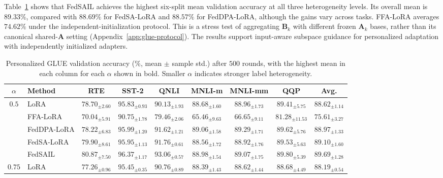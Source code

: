 \documentclass[11pt,letterpaper]{article}
\newcommand{\bA}{\mathbf{A}}
\newcommand{\bB}{\mathbf{B}}
\begin{document}
Table~\ref{tab:glue-personalized} shows that FedSAIL achieves the highest
six-split mean validation accuracy at all three heterogeneity levels.
Its overall mean is $89.33\%$, compared with $88.69\%$ for FedSA-LoRA and
$88.57\%$ for FedDPA-LoRA, although the gains vary across tasks.
FFA-LoRA averages $74.62\%$ under the independent-initialization protocol.
This is a stress test of aggregating $\bB_k$ with different frozen
$\bA_k$ bases, rather than its canonical shared-$\bA$ setting
(Appendix~\ref{app:glue-protocol}). The results support input-aware
subspace guidance for personalized adaptation with independently
initialized adapters.

\begin{table}[htbp!]
    \centering
    \caption{Personalized GLUE validation accuracy (\%, mean $\pm$ sample std.) after $500$ rounds, with the highest mean in each column for each $\alpha$ shown in bold. Smaller $\alpha$ indicates stronger label heterogeneity.}
    \label{tab:glue-personalized}
    \small
    \setlength{\tabcolsep}{1.1pt}
    \begin{tabular*}{\linewidth}{@{\extracolsep{\fill}}clccccccc@{}}
        \toprule
        $\alpha$ & Method & RTE & SST-2 & QNLI & MNLI-m & MNLI-mm & QQP & Avg. \\
        \midrule
        $0.5$ & LoRA        & $78.70_{\pm 2.60}$ & $95.83_{\pm 0.93}$ & $90.13_{\pm 1.93}$ & $88.68_{\pm 1.60}$ & $88.96_{\pm 1.73}$ & $89.41_{\pm 5.75}$ & $88.62_{\pm 1.14}$ \\
              & FFA-LoRA    & $70.04_{\pm 5.91}$ & $90.75_{\pm 1.78}$ & $79.46_{\pm 2.06}$ & $65.46_{\pm 9.63}$ & $66.65_{\pm 9.11}$ & $81.28_{\pm 11.53}$ & $75.61_{\pm 3.27}$ \\
              & FedDPA-LoRA & $78.22_{\pm 6.83}$ & $95.99_{\pm 1.20}$ & $91.62_{\pm 1.21}$ & $\mathbf{89.06}_{\pm 1.58}$ & $\mathbf{89.29}_{\pm 1.71}$ & $89.62_{\pm 5.76}$ & $88.97_{\pm 1.33}$ \\
              & FedSA-LoRA  & $79.90_{\pm 8.61}$ & $95.95_{\pm 1.13}$ & $91.76_{\pm 0.61}$ & $88.56_{\pm 1.72}$ & $88.92_{\pm 1.76}$ & $89.53_{\pm 5.63}$ & $89.10_{\pm 1.60}$ \\
              & FedSAIL      & $\mathbf{80.87}_{\pm 7.50}$ & $\mathbf{96.37}_{\pm 1.17}$ & $\mathbf{93.06}_{\pm 0.57}$ & $88.98_{\pm 1.54}$ & $89.07_{\pm 1.75}$ & $\mathbf{89.80}_{\pm 5.39}$ & $\mathbf{89.69}_{\pm 1.28}$ \\
        \addlinespace
        $0.75$ & LoRA        & $\mathbf{77.26}_{\pm 0.96}$ & $95.45_{\pm 0.35}$ & $90.76_{\pm 0.89}$ & $88.39_{\pm 1.43}$ & $88.62_{\pm 1.44}$ & $88.68_{\pm 4.49}$ & $88.19_{\pm 0.54}$ \\

\end{tabular*}
\end{table}
\end{document}
